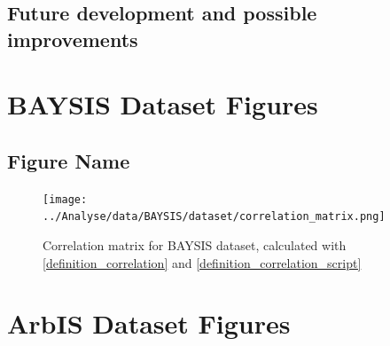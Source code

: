 \documentclass[a4paper,12pt]{report}
\newcommand{\nocontentsline}[3]{}
\newcommand{\tocless}[2]{\bgroup\let\addcontentsline=\nocontentsline#1{#2}\egroup}
\begin{document}
\section{Future development and possible improvements} 



{}

\listoffigures

\listoftables

\printglossary[title=List of Acronyms, type=\acronymtype]

\printglossary[title=List of Terms]

\begin{appendices}

\chapter{BAYSIS Dataset Figures}
\tocless\section{Figure Name}
\label{appendix_TODO}

\tocless\section{}
\label{appendix_correlation_matrix_dataset}
\begin{figure}[H]
	\centering
	\texttt{[image: ../Analyse/data/BAYSIS/dataset/correlation\_matrix.png]}
	\caption{Correlation matrix for BAYSIS dataset, calculated with \ref{definition_correlation} and \ref{definition_correlation_script}}
	\label{img:appendix_correlation_matrix_dataset}
\end{figure}


\chapter{ArbIS Dataset Figures}
\tocless\section{Figure Name}
\label{appendix_TODO}

\end{appendices}
\end{document}
